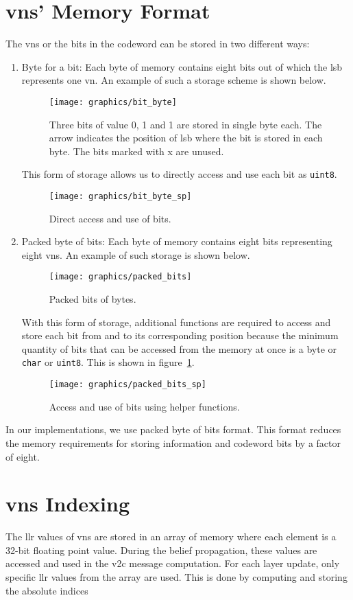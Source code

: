 \section{\aclp{vn}' Memory Format}
The \acp{vn} or the bits in the codeword can be stored in two different ways:
\begin{enumerate}
  \item Byte for a bit: Each byte of memory contains eight bits out of which the \ac{lsb} represents one \ac{vn}. An example of such a storage scheme is shown below.
  \begin{figure}[htbp]
    \centering
    \texttt{[image: graphics/bit\_byte]}
    \caption{Three bits of value 0, 1 and 1 are stored in single byte each. The arrow indicates the position of \ac{lsb} where the bit is stored in each byte. The bits marked with x are unused.}
  \end{figure}
  This form of storage allows us to directly access and use each bit as \texttt{uint8}.
  \begin{figure}[htbp]
    \centering
    \texttt{[image: graphics/bit\_byte\_sp]}
    \caption{Direct access and use of bits.}
  \end{figure}
  \item Packed byte of bits: Each byte of memory contains eight bits representing eight \acp{vn}. An example of such storage is shown below.
  \begin{figure}[htbp]
    \centering
    \texttt{[image: graphics/packed\_bits]}
    \caption{Packed bits of bytes.}
  \end{figure}
  With this form of storage, additional functions are required to access and store each bit from and to its corresponding position because the minimum quantity of bits that can be accessed from the memory at once is a byte or \texttt{char} or \texttt{uint8}. This is shown in figure~\ref{fig:packed_spb}.
  \begin{figure}[htbp]
    \centering
    \texttt{[image: graphics/packed\_bits\_sp]}
    \caption{Access and use of bits using helper functions.}
    \label{fig:packed_spb}
  \end{figure}
\end{enumerate}
In our implementations, we use packed byte of bits format. This format reduces the memory requirements for storing information and codeword bits by a factor of eight.

\section{\aclp{vn} Indexing}
The \ac{llr} values of \acp{vn} are stored in an array of memory where each element is a 32-bit floating point value. During the belief propagation, these values are accessed and used in the \ac{v2c} message computation. For each layer update, only specific \ac{llr} values from the array are used. This is done by computing and storing the absolute indices 
